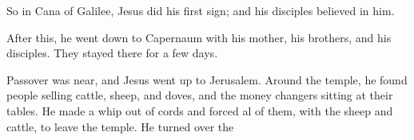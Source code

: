 So in Cana of Galilee, 
Jesus did his first sign;
and his disciples believed in him.

After this,
he went down to Capernaum with his mother, his brothers, and his disciples.
They stayed there for a few days.

Passover was near, and Jesus went up to Jerusalem.
Around the temple, he found people selling cattle, sheep, and doves,
and the money changers sitting at their tables.
He made a whip out of cords and forced al of them,
with the sheep and cattle, 
to leave the temple. 
He turned over the 

